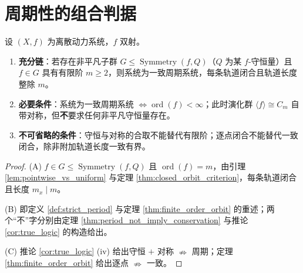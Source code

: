 \section{周期性的组合判据}

\begin{theorem}[周期性的组合判据]\label{thm:combined_criterion}
设 $(X,f)$ 为离散动力系统，$f$ 双射。
\begin{enumerate}[label=(\Alph*)]
    \item \textbf{充分链}：若存在非平凡子群 $G\le\operatorname{Symmetry}(f,Q)$（$Q$ 为某 $f$-守恒量）且 $f\in G$ 具有有限阶 $m\ge 2$，则系统为一致周期系统，每条轨道闭合且轨道长度整除 $m$。
    \item \textbf{必要条件}：系统为一致周期系统 $\iff \operatorname{ord}(f)<\infty$；此时演化群 $\langle f\rangle\cong C_m$ 自带对称，但\textbf{不}要求任何非平凡守恒量存在。
    \item \textbf{不可省略的条件}：守恒与对称的合取不能替代有限阶；逐点闭合不能替代一致闭合，除非附加轨道长度一致有界。
\end{enumerate}
\end{theorem}

\begin{proof}
(A) $f\in G\le\operatorname{Symmetry}(f,Q)$ 且 $\operatorname{ord}(f)=m$，由引理 \ref{lem:pointwise_vs_uniform} 与定理 \ref{thm:closed_orbit_criterion}，每条轨道闭合且长度 $m_x\mid m$。

(B) 即定义 \ref{def:strict_period} 与定理 \ref{thm:finite_order_orbit} 的重述；两个“不”字分别由定理 \ref{thm:period_not_imply_conservation} 与推论 \ref{cor:true_logic} 的构造给出。

(C) 推论 \ref{cor:true_logic} (iv) 给出守恒 $+$ 对称 $\nRightarrow$ 周期；定理 \ref{thm:finite_order_orbit} 给出逐点 $\nRightarrow$ 一致。
\end{proof}

